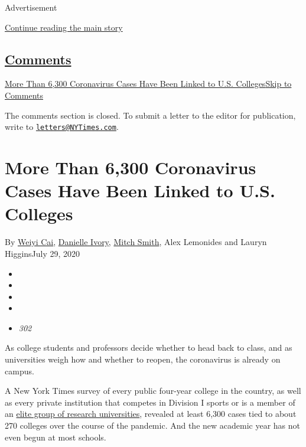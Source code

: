 Advertisement

\protect\hyperlink{after-top}{Continue reading the main story}

\hypertarget{comments}{%
\subsection{\texorpdfstring{\protect\hyperlink{commentsContainer}{Comments}}{Comments}}\label{comments}}

\href{}{More Than 6,300 Coronavirus Cases Have Been Linked to U.S.
Colleges}\href{}{Skip to Comments}

The comments section is closed. To submit a letter to the editor for
publication, write to
\href{mailto:letters@NYTimes.com}{\nolinkurl{letters@NYTimes.com}}.

\hypertarget{more-than-6300-coronavirus-cases-have-been-linked-to-us-colleges}{%
\section{More Than 6,300 Coronavirus Cases Have Been Linked to U.S.
Colleges}\label{more-than-6300-coronavirus-cases-have-been-linked-to-us-colleges}}

By \href{https://www.nytimes3xbfgragh.onion/by/weiyi-cai}{Weiyi Cai},
\href{https://www.nytimes3xbfgragh.onion/by/danielle-ivory}{Danielle
Ivory}, \href{https://www.nytimes3xbfgragh.onion/by/mitch-smith}{Mitch
Smith}, Alex Lemonides and Lauryn HigginsJuly 29, 2020

\begin{itemize}
\item
\item
\item
\item
\item
  \emph{302}
\end{itemize}

As college students and professors decide whether to head back to class,
and as universities weigh how and whether to reopen, the coronavirus is
already on campus.

A New York Times survey of every public four-year college in the
country, as well as every private institution that competes in Division
I sports or is a member of an
\href{https://www.aau.edu/sites/default/files/AAU-Files/Who-We-Are/AAU-Member-List.pdf}{elite
group of research universities}, revealed at least 6,300 cases tied to
about 270 colleges over the course of the pandemic. And the new academic
year has not even begun at most schools.

